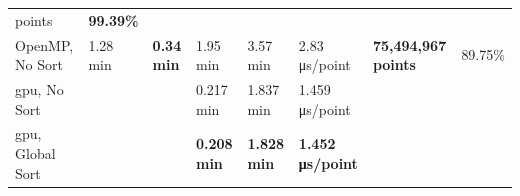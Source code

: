 \begin{table}
\begin{tabular}{l@{\hskip 0.25in}|lll|l|l|l|l}
     points & \textbf{99.39\%}\\
    \cmidrule{1-8}
    OpenMP, No Sort & \multirow{\numExperiments}{*}{1.28 \si{\minute}} & \multirow{\numExperiments}{*}{\textbf{0.34 \si{\minute}}} & 1.95 \si{\minute} & 3.57 \si{\minute} & 2.83 \si{\micro\second}/point & \multirow{\numExperiments}{*}{\textbf{75,494,967 points}} & \multirow{\numExperiments}{*}{89.75\%}\\
    \acrshort{gpu}, No Sort & & & 0.217 \si{\minute} & 1.837 \si{\minute} & 1.459 \si{\micro\second}/point & &\\
    \acrshort{gpu}, Global Sort & & & \textbf{0.208 \si{\minute}} & \textbf{1.828 \si{\minute}} & \textbf{1.452 \si{\micro\second}/point} & &\\
    \bottomrule
    \end{tabular}
\end{table}
\renewcommand{\arraystretch}{1}

